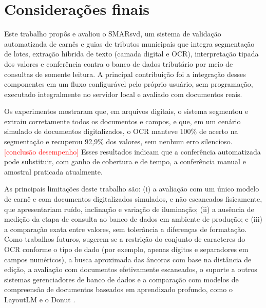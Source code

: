 \documentclass[article,12pt,oneside,a4paper,english,brazil]{abntex2}
\newcommand{\pendente}[1]{\textcolor{red}{#1}}
\newcommand{\CONCLUSAODESEMPENHO}{\pendente{[conclusão desempenho]}}
\begin{document}
\section{Considerações finais}\label{sec:consideracoes}

Este trabalho propôs e avaliou o SMARsvd, um sistema de validação automatizada de
carnês e guias de tributos municipais que integra segmentação de lotes, extração híbrida
de texto (camada digital e OCR), interpretação tipada dos valores e conferência contra o
banco de dados tributário por meio de consultas de somente leitura. A principal
contribuição foi a integração desses componentes em um fluxo configurável pelo próprio
usuário, sem programação, executado integralmente no servidor local e avaliado com
documentos reais.

Os experimentos mostraram que, em arquivos digitais, o sistema segmentou e extraiu
corretamente todos os documentos e campos, e que, em um cenário simulado de documentos
digitalizados, o OCR manteve 100\% de acerto na segmentação e recuperou 92,9\% dos
valores, sem nenhum erro silencioso. \CONCLUSAODESEMPENHO{} Esses resultados indicam que
a conferência automatizada pode substituir, com ganho de cobertura e de tempo, a
conferência manual e amostral praticada atualmente.

As principais limitações deste trabalho são: (i) a avaliação com um único modelo de
carnê e com documentos digitalizados simulados, e não escaneados fisicamente, que
apresentariam ruído, inclinação e variação de iluminação; (ii) a ausência de medição da
etapa de consulta ao banco de dados em ambiente de produção; e (iii) a comparação
exata entre valores, sem tolerância a diferenças de formatação. Como trabalhos futuros,
sugerem-se a restrição do conjunto de caracteres do OCR conforme o tipo de dado (por
exemplo, apenas dígitos e separadores em campos numéricos), a busca aproximada das
âncoras com base na distância de edição, a avaliação com documentos efetivamente
escaneados, o suporte a outros sistemas gerenciadores de banco de dados e a comparação
com modelos de compreensão de documentos baseados em aprendizado profundo, como o
LayoutLM \cite{xu2020layoutlm} e o Donut \cite{kim2022donut}.


\end{document}
